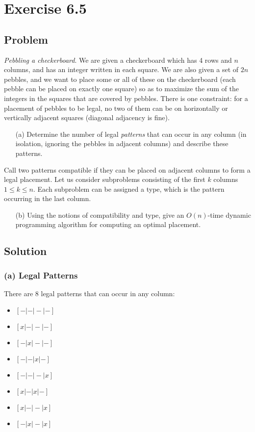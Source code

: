 \documentclass[12pt, letterpaper]{article}
\begin{document}
\section{Exercise 6.5}

\subsection{Problem}

\emph{Pebbling a checkerboard}. We are given a checkerboard which has 4 rows and \(n\) columns, and has an integer written in each square. We are also given a set of \(2n\) pebbles, and we want to place some or all of these on the checkerboard (each pebble can be placed on exactly one square) so as to maximize the sum of the integers in the squares that are covered by pebbles. There is one constraint: for a placement of pebbles to be legal, no two of them can be on horizontally or vertically adjacent squares (diagonal adjacency is fine).
\begin{itemize}
    \item[(a)] Determine the number of legal \emph{patterns} that can occur in any column (in isolation, ignoring the pebbles in adjacent columns) and describe these patterns.
\end{itemize}

Call two patterns compatible if they can be placed on adjacent columns to form a legal placement. Let us consider subproblems consisting of the first \(k\) columns \(1 \leq k \leq n\). Each subproblem can be assigned a type, which is the pattern occurring in the last column.
\begin{itemize}
    \item[(b)] Using the notions of compatibility and type, give an \(O(n)\)-time dynamic programming algorithm for computing an optimal placement.
\end{itemize}

\subsection{Solution}
\subsubsection{(a) Legal Patterns}

There are 8 legal patterns that can occur in any column:
\begin{itemize}
    \item \([-|-|-|-]\)
    \item \([x|-|-|-]\)
    \item \([-|x|-|-]\)
    \item \([-|-|x|-]\)
    \item \([-|-|-|x]\)
    \item \([x|-|x|-]\)
    \item \([x|-|-|x]\)
    \item \([-|x|-|x]\)
\end{itemize}
\end{document}
